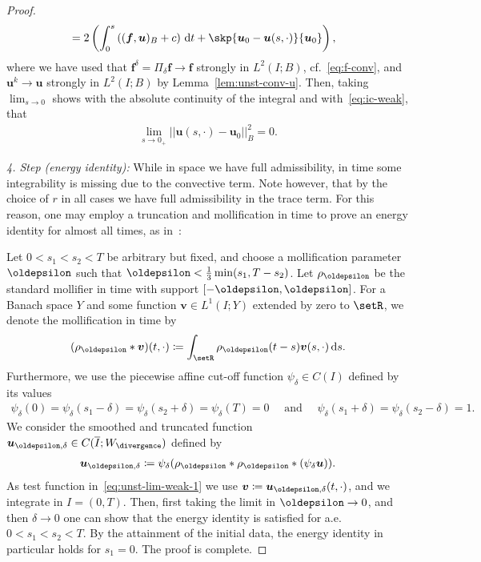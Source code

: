 \documentclass[reqno,a4paper]{amsart}
\def\norm#1{\left|\!\left| #1 \right|\!\right|}
\def\vec#1{\boldsymbol{#1}}
\def\d{{\rm d}}
\def\dt{\,\d t}
\def\bf{\vec{f}}
\def\bu{\vec{u}}
\def\bv{\vec{v}}
\begin{document}
\begin{proof}
\begin{align*}
			& = 2\left( \int_{0}^{s}\left(({\bf},{\bu})_B + c\right) \dt+ \skp{\bu_0 - \bu(s,\cdot)}{\bu_0} \right),
		\end{align*}
		where we have used that $\bf^\delta = \Pi_{\delta} \bf \to \bf$ strongly in $L^2(I;B)$, cf.~\eqref{eq:f-conv}, and $\bu^k \to \bu$ strongly in $L^2(I;B)$ by Lemma~\ref{lem:unst-conv-u}. 
		Then, taking $\lim_{s \to 0}$ shows with the absolute continuity of the integral and with~\eqref{eq:ic-weak}, that 
		\begin{align*}
			\lim_{s \to 0_+} \norm{\bu(s,\cdot) - \bu_0}_B^2  = 0. 
		\end{align*}
		
		\textit{4. Step (energy identity):} 	
		While in space we have full admissibility, in time some integrability is missing due to the convective term.  
		Note however, that by the choice of $r$ in all cases we have full admissibility in the trace term. 
		For this reason, one may employ a truncation and mollification in time to prove an energy identity for almost all times, as in~\cite[Ch.~2.5]{Li.1969}: 
		
		Let $0<s_1<s_2<T$ be arbitrary but fixed, and choose a mollification parameter $\oldepsilon$ such that $\oldepsilon < \tfrac{1}{3}\min(s_1, T - s_2)$. 
		Let $\rho_{\oldepsilon}$ be the standard mollifier in time with support $[-\oldepsilon, \oldepsilon]$. 
		For   a Banach space $Y$ and some function $\bv \in L^1(I;Y)$ extended by zero to $\setR$, we denote the mollification in time by 
		\begin{align*}
			(\rho_{\oldepsilon} * \bv )(t,\cdot) \coloneqq \int_{\setR} \rho_{\oldepsilon}(t-s) \bv(s,\cdot) \,\mathrm{d}s. 
		\end{align*}
		Furthermore, we use the piecewise affine cut-off function $\psi_{\delta} \in C(I)$ defined by its values 
		\begin{align*}
			\psi_{\delta}(0 ) = \psi_{\delta}(s_1 - \delta) = \psi_{\delta}(s_2 + \delta) = \psi_{\delta}(T) = 0
			\quad \text{ and }  \quad \psi_{\delta}(s_1 + \delta) = \psi_{\delta}(s_2 - \delta) = 1. 
		\end{align*}
		We consider the smoothed and truncated function $\bu_{\oldepsilon,\delta} \in C(\overline I;W_{\divergence})$  defined by 
		\begin{align*}
			\bu_{\oldepsilon,\delta} \coloneqq \psi_\delta (\rho_{\oldepsilon} * \rho_{\oldepsilon} * (\psi_{\delta} \bu)). 
		\end{align*} 
		As test function in~\eqref{eq:unst-lim-weak-1} we use $\bv \coloneqq \bu_{\oldepsilon,\delta}(t,\cdot) $, and we integrate in $I = (0,T)$. 
		Then, first taking the limit in $\oldepsilon \to 0$, and then $\delta \to 0$ one can show that the energy identity is satisfied for a.e. $0 < s_1 < s_2 < T$. 
		By the attainment of the initial data, the energy identity in particular holds for $s_1 = 0$. 
		The proof is complete. 
	\end{proof}
	
\end{document}
